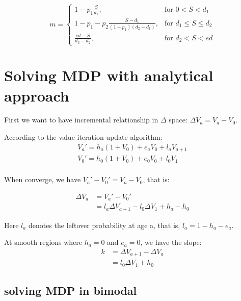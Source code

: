 \documentclass[12pt, letterpaper]{article}
\begin{document}
\[
m = \left\{\begin{array}{lr}
      1-p_1\frac{S}{d_1}, & \text{for } 0 < S < d_1 \\
      1-p_1-p_2\frac{S-d_1}{(1-p_1)(d_2-d_1)}, & \text{for } d_1 \leq S \leq d_2 \\
      \frac{ed-S}{d_3-d_2}, & \text{for } d_2 < S < ed
           \end{array}
           \right.
\]

\section{Solving MDP with analytical approach}

First we want to have incremental relationship in $\Delta$ space: $\Delta V_a = V_a - V_0$.

According to the value iteration update algorithm:
\begin{equation}
\begin{aligned}
V_a' = h_a (1+V_0) + e_a V_0 + l_a V_{a+1} \\
V_0' = h_0 (1+V_0) + e_0 V_0 + l_0 V_1 \\
\end{aligned}
\end{equation}

When converge, we have $V_a' - V_0' = V_a - V_0 $, that is:

\begin{equation}
\begin{aligned}
\Delta V_a & = V_a' - V_0' \\
 & = l_a \Delta V_{a+1} - l_0 \Delta V_1 + h_a - h_0
\end{aligned}
\end{equation}

Here $l_a$ denotes the leftover probability at age a, that is, $l_a = 1- h_a -
e_a$.

At smooth regions where $h_a = 0$ and $e_a = 0$, we have the slope:
\begin{equation}
\begin{aligned}
k & = \Delta V_{a+1} - \Delta V_a \\
& = l_0 \Delta V_1 + h_0
\end{aligned}
\end{equation}

\subsection{solving MDP in bimodal}
\end{document}
